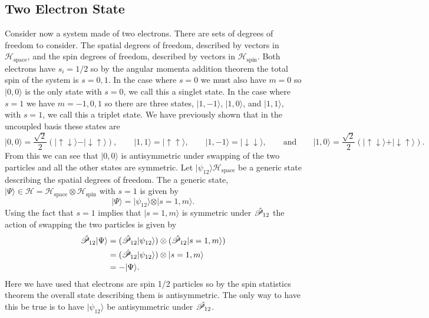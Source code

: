 \documentclass[a4paper]{article}
\renewcommand{\ket}[1]{\vert {#1} \rangle}
\newcommand{\hilbert}{\mathcal{H}}
\newcommand{\parity}{\mathscr{P}}
\newcommand{\tensorProd}{\otimes}
\newcommand{\spinUp}{\uparrow}
\newcommand{\spinDown}{\downarrow}
\theoremstyle{definition}
\begin{document}
    \subsection{Two Electron State}
    Consider now a system made of two electrons.
    There are sets of degrees of freedom to consider.
    The spatial degrees of freedom, described by vectors in \(\hilbert_{\text{space}}\), and the spin degrees of freedom, described by vectors in \(\hilbert_{\text{spin}}\).
    Both electrons have \(s_i = 1/2\) so by the angular momenta addition theorem the total spin of the system is \(s = 0, 1\).
    In the case where \(s = 0\) we must also have \(m = 0\) so \(\ket{0, 0}\) is the only state with \(s = 0\), we call this a singlet state.
    In the case where \(s = 1\) we have \(m = -1, 0, 1\) so there are three states, \(\ket{1, -1}\), \(\ket{1, 0}\), and \(\ket{1, 1}\), with \(s = 1\), we call this a triplet state.
    We have previously shown that in the uncoupled basis these states are
    \[\ket{0, 0} = \frac{\sqrt{2}}{2}(\ket{\spinUp\spinDown} - \ket{\spinDown\spinUp}), \qquad \ket{1, 1} = \ket{\spinUp\spinUp}, \qquad \ket{1, -1} = \ket{\spinDown\spinDown}, \qquad\text{and}\qquad \ket{1, 0} = \frac{\sqrt{2}}{2}(\ket{\spinUp\spinDown} + \ket{\spinDown\spinUp}).\]
    From this we can see that \(\ket{0, 0}\) is antisymmetric under swapping of the two particles and all the other states are symmetric.
    Let \(\ket{\psi_{12}}\hilbert_{\text{space}}\) be a generic state describing the spatial degrees of freedom.
    The a generic state, \(\ket{\Psi} \in \hilbert = \hilbert_{\text{space}}\tensorProd\hilbert_{\text{spin}}\) with \(s = 1\) is given by
    \[\ket{\Psi} = \ket{\psi_{12}}\tensorProd\ket{s=1, m}.\]
    Using the fact that \(s = 1\) implies that \(\ket{s=1, m}\) is symmetric under \(\operator{\parity}_{12}\) the action of swapping the two particles is given by
    \begin{align*}
        \operator{\parity}_{12}\ket{\Psi} &= (\operator{\parity}_{12}\ket{\psi_{12}}) \tensorProd (\operator{\parity}_{12}\ket{s=1, m})\\
        &= (\operator{\parity}_{12}\ket{\psi_{12}}) \tensorProd \ket{s=1, m}\\
        &= -\ket{\Psi}.
    \end{align*}
    Here we have used that electrons are spin 1/2 particles so by the spin statistics theorem the overall state describing them is antisymmetric.
    The only way to have this be true is to have \(\ket{\psi_{12}}\) be antisymmetric under \(\operator{\parity_{12}}\).
\end{document}

